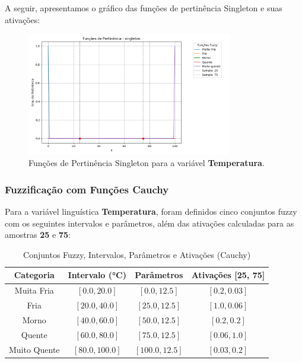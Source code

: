 \documentclass[a4paper,12pt]{article}
\begin{document}
A seguir, apresentamos o gráfico das funções de pertinência Singleton e suas ativações:

\begin{figure}[H]
    \centering
    \includegraphics[width=0.8\textwidth]{img/funções_de_pertinência_singleton_fuzzificado.png}
    \caption{Funções de Pertinência Singleton para a variável \textbf{Temperatura}.}
\end{figure}
\subsubsection{Fuzzificação com Funções Cauchy}

Para a variável linguística \textbf{Temperatura}, foram definidos cinco conjuntos fuzzy com os seguintes intervalos e parâmetros, além das ativações calculadas para as amostras \textbf{25} e \textbf{75}:

\begin{table}[H]
\centering
\caption{Conjuntos Fuzzy, Intervalos, Parâmetros e Ativações (Cauchy)}
\begin{tabular}{|c|c|c|c|}
\hline
\textbf{Categoria}    & \textbf{Intervalo (°C)} & \textbf{Parâmetros}       & \textbf{Ativações [25, 75]} \\ \hline
Muita Fria            & $[0.0, 20.0]$          & $[0.0, 12.5]$             & $[0.2, 0.03]$              \\ \hline
Fria                  & $[20.0, 40.0]$         & $[25.0, 12.5]$            & $[1.0, 0.06]$              \\ \hline
Morno                 & $[40.0, 60.0]$         & $[50.0, 12.5]$            & $[0.2, 0.2]$               \\ \hline
Quente                & $[60.0, 80.0]$         & $[75.0, 12.5]$            & $[0.06, 1.0]$              \\ \hline
Muito Quente          & $[80.0, 100.0]$        & $[100.0, 12.5]$           & $[0.03, 0.2]$              \\ \hline
\end{tabular}
\end{table}
\end{document}
